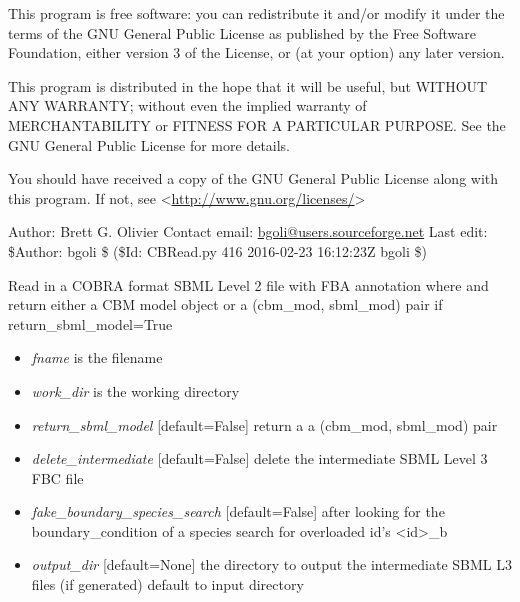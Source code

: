 \documentclass[a4paper,11pt,english]{sphinxmanual}
\begin{document}
This program is free software: you can redistribute it and/or modify
it under the terms of the GNU General Public License as published by
the Free Software Foundation, either version 3 of the License, or
(at your option) any later version.

This program is distributed in the hope that it will be useful,
but WITHOUT ANY WARRANTY; without even the implied warranty of
MERCHANTABILITY or FITNESS FOR A PARTICULAR PURPOSE.  See the
GNU General Public License for more details.

You should have received a copy of the GNU General Public License
along with this program.  If not, see \textless{}\href{http://www.gnu.org/licenses/}{http://www.gnu.org/licenses/}\textgreater{}

Author: Brett G. Olivier
Contact email: \href{mailto:bgoli@users.sourceforge.net}{bgoli@users.sourceforge.net}
Last edit: \$Author: bgoli \$ (\$Id: CBRead.py 416 2016-02-23 16:12:23Z bgoli \$)

\begin{fulllineitems}
\label{modules_doc:cbmpy.CBRead.readCOBRASBML}
Read in a COBRA format SBML Level 2 file with FBA annotation where and return either a CBM model object
or a (cbm\_mod, sbml\_mod) pair if return\_sbml\_model=True
\begin{itemize}
\item {} 
\emph{fname} is the filename

\item {} 
\emph{work\_dir} is the working directory

\item {} 
\emph{return\_sbml\_model} {[}default=False{]} return a a (cbm\_mod, sbml\_mod) pair

\item {} 
\emph{delete\_intermediate} {[}default=False{]} delete the intermediate SBML Level 3 FBC file

\item {} 
\emph{fake\_boundary\_species\_search} {[}default=False{]} after looking for the boundary\_condition of a species search for overloaded id's \textless{}id\textgreater{}\_b

\item {} 
\emph{output\_dir} {[}default=None{]} the directory to output the intermediate SBML L3 files (if generated) default to input directory

\end{itemize}

\end{fulllineitems}
\end{document}
